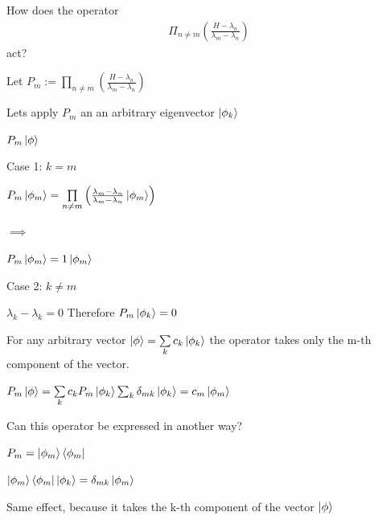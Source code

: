 \documentclass[11pt,a4paper]{scrartcl}
\begin{document}
\begin{enumerate}
\begin{calculationbox}
        \end{calculationbox}

        How does the operator
        \begin{align*}
            \Pi_{n \neq m} \left( \frac{H - \lambda_n}{\lambda_m - \lambda_n} \right)
        \end{align*}
        act?

        \begin{calculationbox}
            Let $P_m := \prod\limits_{n \neq m} \left( \frac{H - \lambda_n}{\lambda_m - \lambda_n} \right)$

            Lets apply $P_m$ an an arbitrary eigenvector $\ket{\phi_k}$
            \begin{calculationbox}
                $P_m \ket{\phi}$

                Case 1: $k = m$
                \begin{calculationbox}
                    $P_m \ket{\phi_m} = \prod\limits_{n \neq m} \left( \frac{\lambda_m - \lambda_n}{\lambda_m - \lambda_n} \ket{\phi_m} \right)$

                    $\implies$

                    $P_m \ket{\phi_m} = 1 \ket{\phi_m}$
                \end{calculationbox}

                Case 2: $k \neq m$
                \begin{calculationbox}
                    $\lambda_k - \lambda_k = 0$
                    Therefore $P_m \ket{\phi_k} = 0$
                \end{calculationbox}
            \end{calculationbox}
            
            For any arbitrary vector $\ket{\phi} = \sum\limits_k c_k \ket{\phi_k}$ the operator takes only the m-th component of the vector.
            
            $P_m \ket{\phi}
            =\sum\limits_k c_k P_m \ket{\phi_k} \sum_k \delta_{mk} \ket{\phi_k}
            = c_m \ket{\phi_m}
            $
        \end{calculationbox}

        Can this operator be expressed in another way?
        \begin{calculationbox}
            $P_m = \ket{\phi_m} \bra{\phi_m}$

            $\ket{\phi_m} \bra{\phi_m} \ket{\phi_k} = \delta_{mk} \ket{\phi_m}$

            Same effect, because it takes the k-th component of the vector $\ket{\phi}$


\end{calculationbox}
\end{enumerate}
\end{document}
